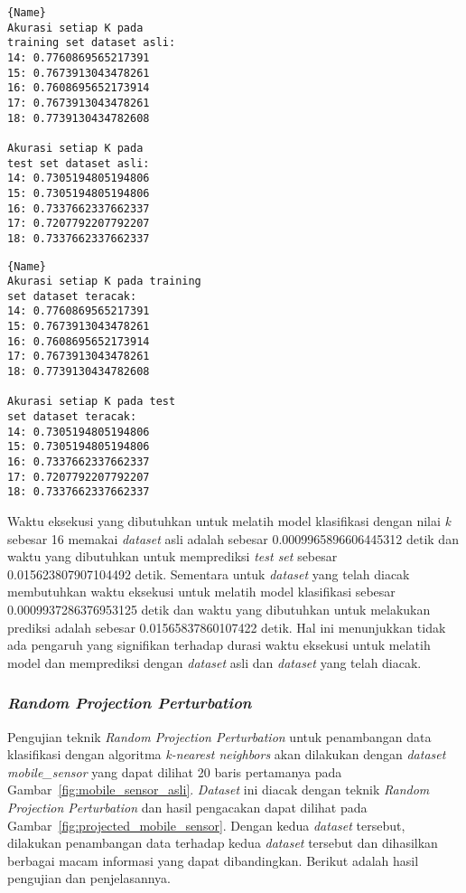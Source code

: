 \noindent\begin{minipage}{.46\textwidth}
	\begin{lstlisting}[caption=\textit{Dataset diabetes} Asli,frame=tlrb, label=diabetes_akurasi_asli]{Name}
Akurasi setiap K pada 
training set dataset asli:
14: 0.7760869565217391
15: 0.7673913043478261
16: 0.7608695652173914
17: 0.7673913043478261
18: 0.7739130434782608

Akurasi setiap K pada 
test set dataset asli: 
14: 0.7305194805194806
15: 0.7305194805194806
16: 0.7337662337662337
17: 0.7207792207792207
18: 0.7337662337662337
	\end{lstlisting}
\end{minipage}\hfill
\begin{minipage}{.46\textwidth}
	\begin{lstlisting}[caption=\textit{Dataset diabetes} Teracak,frame=tlrb, label=diabetes_akurasi_randomisasi]{Name}
Akurasi setiap K pada training 
set dataset teracak: 
14: 0.7760869565217391
15: 0.7673913043478261
16: 0.7608695652173914
17: 0.7673913043478261
18: 0.7739130434782608

Akurasi setiap K pada test 
set dataset teracak: 
14: 0.7305194805194806
15: 0.7305194805194806
16: 0.7337662337662337
17: 0.7207792207792207
18: 0.7337662337662337
	\end{lstlisting}
\end{minipage}
	
Waktu eksekusi yang dibutuhkan untuk melatih model klasifikasi dengan nilai \textit{k} sebesar 16 memakai \textit{dataset} asli adalah sebesar 0.0009965896606445312 detik dan waktu yang dibutuhkan untuk memprediksi \textit{test set} sebesar 0.015623807907104492 detik. Sementara untuk \textit{dataset} yang telah diacak membutuhkan waktu eksekusi untuk melatih model klasifikasi sebesar 0.0009937286376953125 detik dan waktu yang dibutuhkan untuk melakukan prediksi adalah sebesar 0.01565837860107422 detik. Hal ini menunjukkan tidak ada pengaruh yang signifikan terhadap durasi waktu eksekusi untuk melatih model dan memprediksi dengan \textit{dataset} asli dan \textit{dataset} yang telah diacak.

\subsubsection{\textit{Random Projection Perturbation}}
\label{subsubsec:pengujian-klasifikasi-rpp}

Pengujian teknik \textit{Random Projection Perturbation} untuk penambangan data klasifikasi dengan algoritma \textit{k-nearest neighbors} akan dilakukan dengan \textit{dataset} \textit{mobile\_sensor} yang dapat dilihat 20 baris pertamanya pada Gambar~\ref{fig:mobile_sensor_asli}. \textit{Dataset} ini diacak dengan teknik \textit{Random Projection Perturbation} dan hasil pengacakan dapat dilihat pada Gambar~\ref{fig:projected_mobile_sensor}. Dengan kedua \textit{dataset} tersebut, dilakukan penambangan data terhadap kedua \textit{dataset} tersebut dan dihasilkan berbagai macam informasi yang dapat dibandingkan. Berikut adalah hasil pengujian dan penjelasannya.


